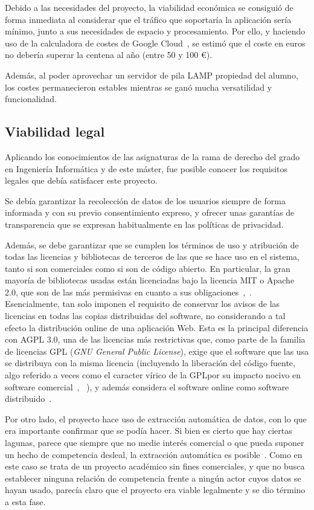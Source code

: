 Debido a las necesidades del proyecto, la viabilidad económica se consiguió de forma inmediata al considerar que el tráfico que soportaría la aplicación sería mínimo, junto a sus necesidades de espacio y procesamiento. Por ello, y haciendo uso de la calculadora de costes de Google Cloud~\cite{calculadora_app_engine}, se estimó que el coste en euros no debería superar la centena al año (entre 50 y 100 €).

Además, al poder aprovechar un servidor de pila LAMP propiedad del alumno, los costes permanecieron estables mientras se ganó mucha versatilidad y funcionalidad.

\subsection{Viabilidad legal}

Aplicando los conocimientos de las asignaturas de la rama de derecho del grado en Ingeniería Informática y de este máster, fue posible conocer los requisitos legales que debía satisfacer este proyecto.

Se debía garantizar la recolección de datos de los usuarios siempre de forma informada y con su previo consentimiento expreso, y ofrecer unas garantías de transparencia que se expresan habitualmente en las políticas de privacidad.

Además, se debe garantizar que se cumplen los términos de uso y atribución de todas las licencias y bibliotecas de terceros de las que se hace uso en el sistema, tanto si son comerciales como si son de código abierto. En particular, la gran mayoría de bibliotecas usadas están licenciadas bajo la licencia MIT o Apache 2.0, que son de las más permisivas en cuanto a sus obligaciones~\cite{MIT},~\cite{Apache2}. Esencialmente, tan solo imponen el requisito de conservar los avisos de las licencias en todas las copias distribuidas del software, no considerando a tal efecto la distribución online de una aplicación Web. Esta es la principal diferencia con AGPL 3.0, una de las licencias más restrictivas que, como parte de la familia de licencias GPL (\textit{GNU General Public License}), exige que el software que las usa se distribuya con la misma licencia (incluyendo la liberación del código fuente, algo referido a veces como \guillemotleft el caracter vírico de la GPL\guillemotright\space por su impacto nocivo en software comercial~\cite{licencia_virica}, ~\cite{GPL}), y además considera el software online como software distribuido~\cite{AGPL}.

Por otro lado, el proyecto hace uso de extracción automática de datos, con lo que era importante confirmar que se podía hacer. Si bien es cierto que hay ciertas lagunas, parece que siempre que no medie interés comercial o que pueda suponer un hecho de competencia desleal, la extracción automática es posible~\cite{scraping_legal}. Como en este caso se trata de un proyecto académico sin fines comerciales, y que no busca establecer ninguna relación de competencia frente a ningún actor cuyos datos se hayan usado, parecía claro que el proyecto era viable legalmente y se dio término a esta fase.